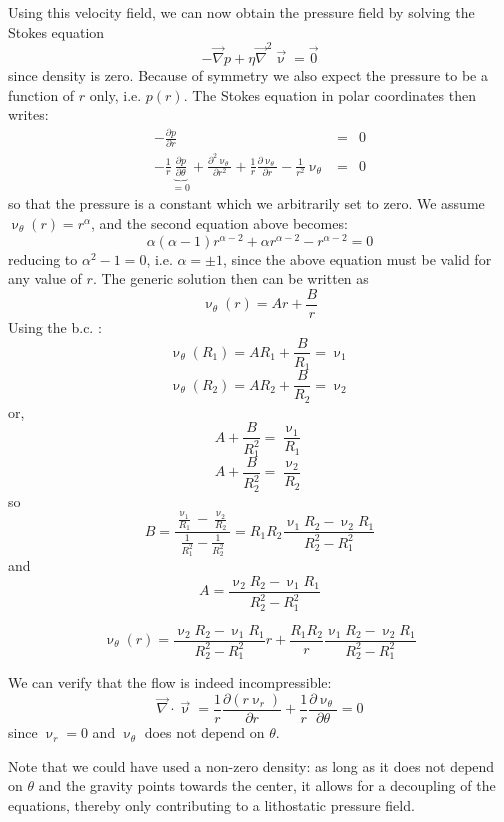 Using this velocity field, we can now obtain the pressure field 
by solving the Stokes equation
\[
-\vec\nabla p + \eta {\vec\nabla}^2 {\vec \upnu} = {\vec 0}
\]
since density is zero. Because of symmetry we also expect the pressure to
be a function of $r$ only, i.e. $p(r)$.
The Stokes equation in polar coordinates then writes:
\begin{eqnarray}
-\frac{\partial p}{\partial r} &=& 0 \\
-\frac{1}{r}\underbrace{\frac{\partial p}{\partial \theta}}_{=0} + 
\frac{\partial^2 \upnu_\theta}{\partial r^2} + \frac{1}{r} \frac{\partial \upnu_\theta}{\partial r} 
- \frac{1}{r^2} \upnu_\theta  &=&0 
\end{eqnarray}
so that the pressure is a constant which we arbitrarily set to zero. 
We assume $\upnu_\theta(r) = r^\alpha$, and the second equation above becomes: 
\[
\alpha(\alpha-1) r^{\alpha-2}  + \alpha r^{\alpha-2}  - r^{\alpha-2}  = 0 
\]
reducing to $\alpha^2-1=0$, i.e. $\alpha=\pm 1$, since the above equation must be valid
for any value of $r$.
The generic solution then can be written as
\[
\upnu_\theta (r) = A r + \frac{B}{r}
\]
Using the b.c. : 
\[
\upnu_\theta (R_1) = A R_1 + \frac{B}{R_1} = \upnu_1
\]
\[
\upnu_\theta (R_2) = A R_2 + \frac{B}{R_2} = \upnu_2
\]
or, 
\[
A + \frac{B}{R_1^2} = \frac{\upnu_1}{R_1}
\]
\[
A + \frac{B}{R_2^2} = \frac{\upnu_2}{R_2}
\]
so
\[
B=\frac{ \frac{\upnu_1}{R_1}-\frac{\upnu_2}{R_2}  }{\frac{1}{R_1^2} - \frac{1}{R_2^2}} = 
R_1R_2 \frac{ \upnu_1R_2-\upnu_2R_1    }{R_2^2-R_1^2}
\]
and 
\[
A=\frac{\upnu_2R_2-\upnu_1R_1}{R_2^2-R_1^2}
\]


\begin{mdframed}[backgroundcolor=blue!5]
\[
\upnu_\theta (r) = \frac{\upnu_2R_2-\upnu_1R_1}{R_2^2-R_1^2}  r 
+ \frac{R_1R_2}{r} \frac{ \upnu_1R_2-\upnu_2R_1    }{R_2^2-R_1^2}
\]
\end{mdframed}


We can verify that the flow is indeed incompressible:
\[
\vec\nabla\cdot\vec\upnu = \frac{1}{r}\frac{\partial (r\upnu_r)}{\partial r} 
+ \frac{1}{r}\frac{\partial \upnu_\theta}{\partial \theta} = 0
\]
since $\upnu_r=0$ and $\upnu_\theta$ does not depend on $\theta$.

Note that we could have used a non-zero density: as long as it does not 
depend on $\theta$ and the gravity points towards the center,
it allows for a decoupling of the equations, thereby 
only contributing to a lithostatic pressure field.


